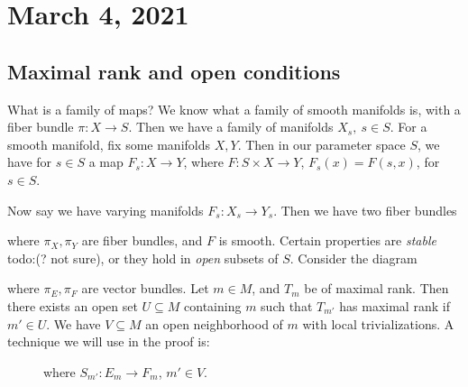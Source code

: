\section{March 4, 2021}

\subsection{Maximal rank and open conditions}
What is a family of maps? We know what a family of smooth manifolds is, with a fiber bundle $\pi \colon X \to S$. Then we have a family of manifolds $X_s, \ s \in S$. For a smooth manifold, fix some manifolds $X,Y$. Then in our parameter space $S$, we have for $s \in S$ a map $F_s \colon X \to Y$, where $F \colon S\times X \to Y$, $F_s(x)=F(s,x)$, for $s \in S$.

Now say we have varying manifolds $F_s \colon X_s \to Y_s$. Then we have two fiber bundles 
\begin{figure}[H]
\centering
{}
\end{figure}    
where $\pi_X,\pi_Y$ are fiber bundles, and $F$ is smooth. Certain properties are \emph{stable} {\color{red}todo:(? not sure)}, or they hold in \emph{open} subsets of $S$. Consider the diagram
\begin{figure}[H]
\centering
{}
\end{figure} where $\pi_E,\pi_F$ are vector bundles. Let $m \in M$, and $T_m$ be of maximal rank. Then there exists an open set $U\subseteq M$ containing $m$ such that $T_{m'}$ has maximal rank if $m' \in U$. We have $V \subseteq M$ an open neighborhood of $m$ with local trivializations. A technique we will use in the proof is:
\begin{figure}[H]
\centering
{} where $S_{m'}\colon E_m \to F_m$, $m' \in V$.
\end{figure}
